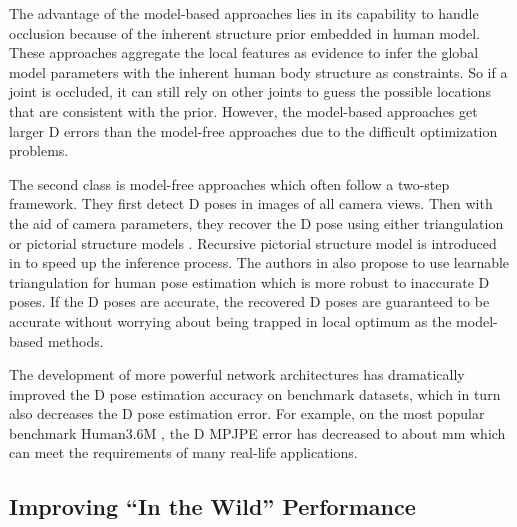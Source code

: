 The advantage of the model-based approaches lies in its capability to handle occlusion because of the inherent structure prior embedded in human model. These approaches aggregate the local features as evidence to infer the global model parameters with the inherent human body structure as constraints. So if a joint is occluded, it can still rely on other joints to guess the possible locations that are consistent with the prior. However, the model-based approaches get larger D errors than the model-free approaches due to the difficult optimization problems.

The second class is model-free approaches \citep{qiu2019cross,iskakov2019learnable,burenius20133D,PavlakosZDD17,dong2019fast,amin2013multi,belagiannis20143d,wang2019meta} which often follow a two-step framework. They first detect D poses in images of all camera views. Then with the aid of camera parameters, they recover the D pose using either triangulation \citep{amin2013multi,iskakov2019learnable} or pictorial structure models \citep{burenius20133D,PavlakosZDD17,dong2019fast}. Recursive pictorial structure model is introduced in \citep{qiu2019cross} to speed up the inference process. The authors in \citep{iskakov2019learnable} also propose to use learnable triangulation \citep{hartley2003multiple} for human pose estimation which is more robust to inaccurate D poses. If the D poses are accurate, the recovered D poses are guaranteed to be accurate without worrying about being trapped in local optimum as the model-based methods. 

The development of more powerful network architectures \citep{newell2016stacked,sun2019deep} has dramatically improved the D pose estimation accuracy on benchmark datasets, which in turn also decreases the D pose estimation error. For example, on the most popular benchmark Human3.6M \citep{ionescu2014human3}, the D MPJPE error has decreased to about mm which can meet the requirements of many real-life applications.



\subsection{Improving ``In the Wild'' Performance}
\label{sec:related_wild}

